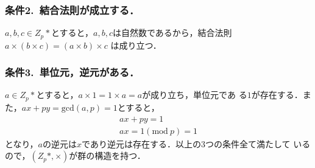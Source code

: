 \documentclass[a4paper,12pt]{jarticle}
\begin{document}
\subsubsection*{条件2.~結合法則が成立する．}
\vspace{-5mm}
$a,b,c\in Z_p*$とすると，$a,b,c$は自然数であるから，結合法則
$a \times (b \times c)=(a \times b) \times c$
は成り立つ．
%
\vspace{-5mm}
\subsubsection*{条件3.~単位元，逆元がある．}
\vspace{-5mm}
$a\in Z_p*$とすると，$a \times 1 = 1 \times a = a$が成り立ち，単位元であ
る$1$が存在する．また，$ax+py=\mathrm{gcd}(a,p)=1$とすると，
%
\begin{eqnarray}
 ax + py = 1\\
 ax = 1(\mathrm{mod}~p) = 1
\end{eqnarray}
%
となり，$a$の逆元は$x$であり逆元は存在する．以上の3つの条件全て満たして
いるので，$(Z_p*,\times)$が群の構造を持つ．
\vspace{-5mm}
\end{document}
